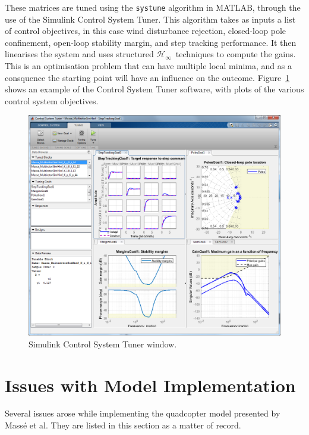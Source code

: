 \documentclass[a4paper,12pt]{article}
\newcommand{\hinf}{\mathcal{H}_\infty}
\newcommand{\Hinf}{\(\hinf\)}
\begin{document}
        These matrices are tuned using the \verb|systune| algorithm in MATLAB, through the use of the Simulink Control System Tuner. This algorithm takes as inputs a list of control objectives, in this case wind disturbance rejection, closed-loop pole confinement, open-loop stability margin, and step tracking performance. It then linearises the system and uses structured \Hinf\ techniques to compute the gains. This is an optimisation problem that can have multiple local minima, and as a consquence the starting point will have an influence on the outcome. Figure~\ref{fig:ctrl_systemtuner.png} shows an example of the Control System Tuner software, with plots of the various control system objectives.

        \begin{figure}[h!]
            \centering%
            \includegraphics[width=16cm]{ctrl_systemtuner.png}%
            \caption{Simulink Control System Tuner window.}\label{fig:ctrl_systemtuner.png}
        \end{figure}

    \section{Issues with Model Implementation}\label{sec:issues}

        Several issues arose while implementing the quadcopter model presented by Mass{\'e} et al. They are listed in this section as a matter of record.
\end{document}
